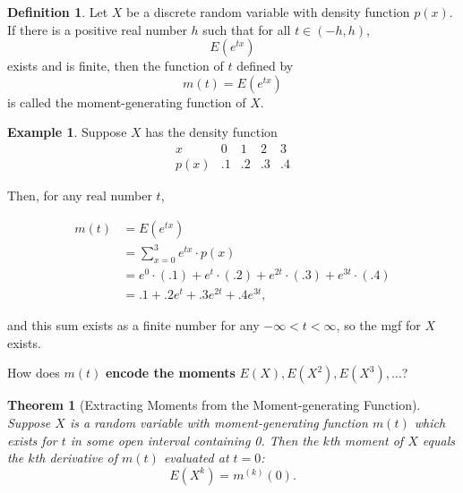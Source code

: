 \documentclass[
]{book}
\newtheorem{theorem}{Theorem}[chapter]
\theoremstyle{definition}
\newtheorem{definition}{Definition}[chapter]
\theoremstyle{definition}
\newtheorem{example}{Example}[chapter]
\theoremstyle{definition}
\theoremstyle{definition}
\theoremstyle{remark}
\begin{document}
\begin{definition}
\protect\hypertarget{def:moment-generating-function}{}\label{def:moment-generating-function}Let \(X\) be a discrete random variable with density function \(p(x)\). If there is a positive real number \(h\) such that for all \(t \in (-h,h)\), \[E(e^{tx})\] exists and is finite, then the function of \(t\) defined by \[m(t) = E(e^{tx})\] is called the moment-generating function of \(X\).
\end{definition}

\begin{example}
Suppose \(X\) has the density function
\[
\begin{array}{c|c|c|c|c}
x & 0 & 1 & 2 & 3  \\ \hline
p(x) & .1 & .2 & .3 & .4
\end{array}
\]

Then, for any real number \(t\),

\begin{align*}
m(t) &= E(e^{tx}) \\
  &= \sum_{x=0}^3 e^{tx}\cdot p(x)\\
  &= e^0\cdot (.1) +e^t\cdot (.2)+e^{2t}\cdot (.3) +e^{3t}\cdot (.4)\\
  &= .1 + .2e^t + .3e^{2t} + .4e^{3t},
\end{align*}

and this sum exists as a finite number for any \(-\infty < t < \infty\), so the mgf for \(X\) exists.
\end{example}

How does \(m(t)\) \textbf{encode the moments} \(E(X), E(X^2), E(X^3), \ldots\)?

\begin{theorem}[Extracting Moments from the Moment-generating Function]
\protect\hypertarget{thm:mgf}{}\label{thm:mgf}Suppose \(X\) is a random variable with moment-generating function \(m(t)\) which exists for \(t\) in some open interval containing 0. Then the \(k\)th moment of \(X\) equals the \(k\)th derivative of \(m(t)\) evaluated at \(t = 0\):
\[E(X^k) = m^{(k)}(0).\]
\end{theorem}
\end{document}
